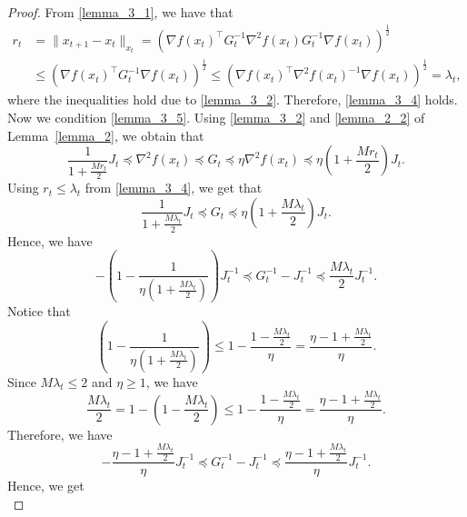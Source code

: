 \documentclass[11pt]{article}
\numberwithin{assumption}{section}
\numberwithin{remark}{section}
\numberwithin{theorem}{section}
\begin{document}
\begin{proof}
From \eqref{lemma_3_1}, we have that
\begin{equation}
\begin{split}
    r_t & = \|x_{t + 1} - x_t\|_{x_t} = \left(\nabla{f(x_t)}^\top G^{-1}_t\nabla^2{f(x_t)}G^{-1}_t\nabla{f(x_t)}\right)^\frac{1}{2}\\
    & \leq  \left(\nabla{f(x_t)}^\top G^{-1}_t\nabla{f(x_t)}\right)^\frac{1}{2} \leq  \left(\nabla{f(x_t)}^\top \nabla^2{f(x_t)}^{-1}\nabla{f(x_t)}\right)^\frac{1}{2} = \lambda_t,
\end{split}
\end{equation}
where the inequalities hold due to \eqref{lemma_3_2}. Therefore, \eqref{lemma_3_4} holds. Now we condition \eqref{lemma_3_5}. Using \eqref{lemma_3_2} and \eqref{lemma_2_2} of Lemma~\ref{lemma_2}, we obtain that
\begin{equation}
    \frac{1}{1 + \frac{Mr_t}{2}}J_t \preceq \nabla^2{f(x_t)} \preceq G_t \preceq \eta \nabla^2{f(x_t)} \preceq \eta(1 + \frac{Mr_t}{2})J_t.
\end{equation}
Using $r_t \leq \lambda_t$ from \eqref{lemma_3_4}, we get that
\begin{equation}
    \frac{1}{1 + \frac{M\lambda_t}{2}}J_t \preceq G_t \preceq \eta(1 + \frac{M\lambda_t}{2})J_t.
\end{equation}
Hence, we have
\begin{equation}
    -\left(1 - \frac{1}{\eta(1 + \frac{M\lambda_t}{2})}\right)J^{-1}_t \preceq G^{-1}_t - J^{-1}_t \preceq \frac{M\lambda_t}{2}J^{-1}_t.
\end{equation}
Notice that
\begin{equation}
    \left(1 - \frac{1}{\eta(1 + \frac{M\lambda_t}{2})}\right) \leq 1 - \frac{1 - \frac{M\lambda_t}{2}}{\eta} = \frac{\eta - 1 + \frac{M\lambda_t}{2}}{\eta}.
\end{equation}
Since $M\lambda_t \leq 2$ and $\eta \geq 1$, we have
\begin{equation}
    \frac{M\lambda_t}{2} = 1 - (1 - \frac{M\lambda_t}{2}) \leq 1 - \frac{1 - \frac{M\lambda_t}{2}}{\eta} = \frac{\eta - 1 + \frac{M\lambda_t}{2}}{\eta}.
\end{equation}
Therefore, we have
\begin{equation}
    -\frac{\eta - 1 + \frac{M\lambda_t}{2}}{\eta}J^{-1}_t \preceq G^{-1}_t - J^{-1}_t \preceq \frac{\eta - 1 + \frac{M\lambda_t}{2}}{\eta}J^{-1}_t.
\end{equation}
Hence, we get
\begin{equation}

\end{equation}
\end{proof}
\end{document}
